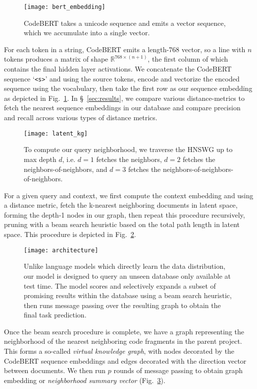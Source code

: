 \documentclass[11pt]{article}
\begin{document}
\begin{figure}[H]
  \centering
  \texttt{[image: bert\_embedding]}
  \caption{CodeBERT takes a unicode sequence and emits a vector sequence, which we accumulate into a single vector.}
  \label{fig:bert}
\end{figure}

For each token in a string, CodeBERT emits a length-768 vector, so a line with $n$ tokens produces a matrix of shape $\mathbb R^{768 \times (n + 1)}$, the first column of which contains the final hidden layer activations. We concatenate the CodeBERT sequence `\texttt{<s>}' and using the source tokens, encode and vectorize the encoded sequence using the vocabulary, then take the first row as our sequence embedding as depicted in Fig.~\ref{fig:bert}. In \S~\ref{sec:results}, we compare various distance-metrics to fetch the nearest sequence embeddings in our database and compare precision and recall across various types of distance metrics.

\begin{figure}[H]
  \centering
  \texttt{[image: latent\_kg]}
  \caption{To compute our query neighborhood, we traverse the HNSWG up to max depth $d$, i.e. $d=1$ fetches the neighbors, $d=2$ fetches the neighbors-of-neighbors, and $d=3$ fetches the neighbors-of-neighbors-of-neighbors.}
  \label{fig:de2kg}
\end{figure}

For a given query and context, we first compute the context embedding and using a distance metric, fetch the k-nearest neighboring documents in latent space, forming the depth-1 nodes in our graph, then repeat this procedure recursively, pruning with a beam search heuristic based on the total path length in latent space. This procedure is depicted in Fig.~\ref{fig:de2kg}.

\begin{figure}[H]
  \centering
  \texttt{[image: architecture]}
  \caption{Unlike language models which directly learn the data distribution, our model is designed to query an unseen database only available at test time. The model scores and selectively expands a subset of promising results within the database using a beam search heuristic, then runs message passing over the resulting graph to obtain the final task prediction.}
  \label{fig:architecture}
\end{figure}

Once the beam search procedure is complete, we have a graph representing the neighborhood of the nearest neighboring code fragments in the parent project. This forms a so-called \textit{virtual knowledge graph}, with nodes decorated by the CodeBERT sequence embeddings and edges decorated with the direction vector between documents. We then run $p$ rounds of message passing to obtain graph embedding or \textit{neighborhood summary vector} (Fig.~\ref{fig:architecture}).
\end{document}
